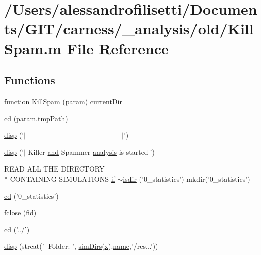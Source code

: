 \hypertarget{a00029}{\section{/\-Users/alessandrofilisetti/\-Documents/\-G\-I\-T/carness/\-\_\-analysis/old/\-Kill\-Spam.m File Reference}
\label{a00029}
}
\subsection*{Functions}
\begin{DoxyCompactItemize}
\item 
\hyperlink{a00110_a4b4c670b101bf7a838f775e008fa6255}{function} \hyperlink{a00029_acfbe15da69f5cf2e58667e2b19b500e7}{Kill\-Spam} (\hyperlink{a00033_a51f20d6b1b54a2eee3be0e8adc96a0ae}{param}) \hyperlink{a00031_af32eb97339f1e9d37b5540de2cbc79c9}{current\-Dir}
\item 
\hyperlink{a00029_a60547755325ad4e7a25c614f83776ee7}{cd} (\hyperlink{a00032_a1e5a4863ab2b87f923e1d19e2da1f5ac}{param.\-tmp\-Path})
\item 
\hyperlink{a00029_a3015506d09b4ef94312c10ce85f4c3ad}{disp} ('$|$-\/-\/-\/-\/-\/-\/-\/-\/-\/-\/-\/-\/-\/-\/-\/-\/-\/-\/-\/-\/-\/-\/-\/-\/-\/-\/-\/-\/-\/-\/-\/-\/-\/-\/-\/-\/-\/-\/-\/-\/-\/$|$')
\item 
\hyperlink{a00029_a16c8f16b559b22e1f31c9e00f75fe520}{disp} ('$|$-\/Killer \hyperlink{a00028_a170f8acb213f91bf71c77b1d20bceb33}{and} Spammer \hyperlink{a00032_abf6e5638a23a2531114655f3f690b70c}{analysis} is started$|$')
\item 
R\-E\-A\-D A\-L\-L T\-H\-E D\-I\-R\-E\-C\-T\-O\-R\-Y \\*
C\-O\-N\-T\-A\-I\-N\-I\-N\-G S\-I\-M\-U\-L\-A\-T\-I\-O\-N\-S \hyperlink{a00030_a01d55766b8058903dd360b4bda71f9f5}{if} \hyperlink{a00029_aef429e9a25e0d4d70aa2037a59816956}{$\sim$isdir} ('0\-\_\-statistics') mkdir('0\-\_\-statistics')
\item 
\hyperlink{a00029_a365d011aeb5adcedc5cc75e7df629a6f}{cd} ('0\-\_\-statistics')
\item 
\hyperlink{a00029_a5e769bbbabcaddc548203741c7100228}{fclose} (\hyperlink{a00031_ae9011d40c6f13e68e6f07156e0da7c5d}{fid})
\item 
\hyperlink{a00029_a7eb00a69197e8905221801683c7ec02a}{cd} ('../')
\item 
\hyperlink{a00029_a609f02c862f2843febf3408f688be8e8}{disp} (strcat('$|$-\/Folder\-: ', \hyperlink{a00031_aae5035eb84b89176ed5b06e136325eff}{sim\-Dirs}(\hyperlink{a00031_a7265972fe485274cfff77a9bb07b8fce}{x}).\hyperlink{a00027_abbf559a76fab59203496b0847ab9502a}{name},'/res...'))

\end{DoxyCompactItemize}
